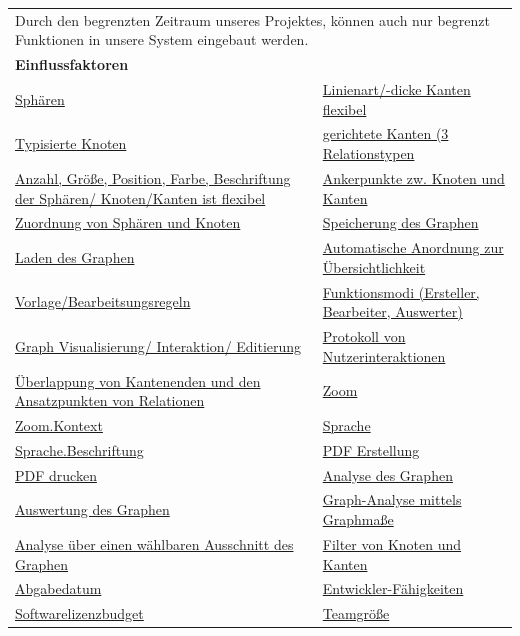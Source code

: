 \documentclass[enabledeprecatedfontcommands,fontsize=11pt,paper=a4,twoside]{scrartcl}
\newcounter{one}
\begin{document}
\begin{tabular} {|p{8cm} p{8cm}|}
	\hline
	\rowcolor{prob}\multicolumn{2}{|l|}{\parbox{16cm}{\textbf{16: Begrenzter Funktionsumfang durch Bearbeitszeit}}} \\  \hline\hline 
	\multicolumn{2}{|l|}{\parbox{16cm}{Durch den begrenzten Zeitraum unseres Projektes, können auch nur begrenzt Funktionen in unsere System eingebaut werden.}}\rule{0pt}{4ex}\\ [1ex] \hline
	\multicolumn{2}{|l|}{\textbf{Einflussfaktoren}}\\
	\hyperlink {n}{Sphären} &
	\hyperlink {o}{Linienart/-dicke Kanten flexibel}\\
	\hyperlink {p}{Typisierte Knoten} &
	\hyperlink {q}{gerichtete Kanten (3 Relationstypen} \\
	\hyperlink {r}{Anzahl, Größe, Position, Farbe, Beschriftung der Sphären/ Knoten/Kanten ist flexibel} &
	\hyperlink {s}{Ankerpunkte zw. Knoten und Kanten} \\
	\hyperlink {t}{Zuordnung von Sphären und Knoten} &
	\hyperlink {v}{Speicherung des Graphen} \\
	\hyperlink {w}{Laden des Graphen} &
	\hyperlink {x}{Automatische Anordnung zur Übersichtlichkeit} \\
	\hyperlink {y}{Vorlage/Bearbeitsungsregeln} &
	\hyperlink {z}{Funktionsmodi (Ersteller, Bearbeiter, Auswerter)} \\
	\hyperlink {aa}{Graph Visualisierung/ Interaktion/ Editierung}&
	\hyperlink {bb}{Protokoll von Nutzerinteraktionen} \\
	\hyperlink {cc}{Überlappung von Kantenenden und den Ansatzpunkten von Relationen} &
	\hyperlink {ee}{Zoom} \\
	\hyperlink {ff}{Zoom.Kontext} &
	\hyperlink {gg}{Sprache} \\
	\hyperlink {hh}{Sprache.Beschriftung} &
	\hyperlink {kk}{PDF Erstellung} \\
	\hyperlink {ll}{PDF drucken} &
	\hyperlink {oo}{Analyse des Graphen} \\
	\hyperlink {pp}{Auswertung des Graphen} &
	\hyperlink {qq}{Graph-Analyse mittels Graphmaße} \\ 
	\hyperlink {rr}{Analyse über einen wählbaren Ausschnitt des Graphen} &
	\hyperlink {ss}{Filter von Knoten und Kanten} \\
	\hyperlink {uu}{Abgabedatum} &
	\hyperlink {vv}{Entwickler-Fähigkeiten} \\
	\hyperlink {ww}{Softwarelizenzbudget} &
	\hyperlink {xx}{Teamgröße} 
	\\ \hline

\end{tabular}
\end{document}
